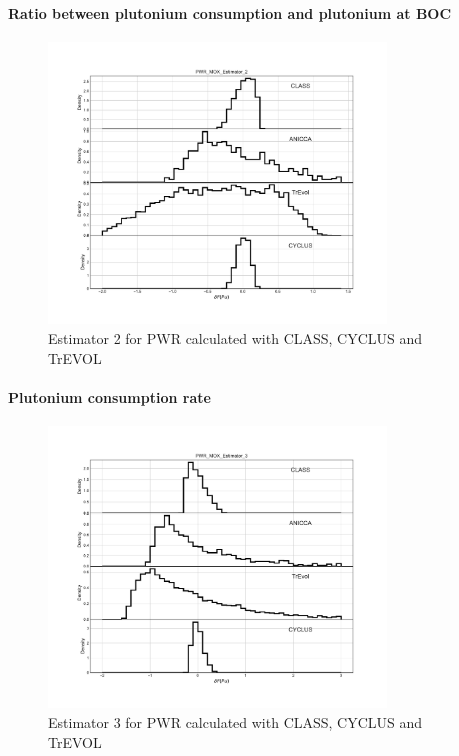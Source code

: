 \paragraph{Ratio between plutonium consumption and plutonium at BOC}
\begin{figure}[h]
	\begin{center}
		\includegraphics[width = 0.8\textwidth]{../../Feature_1/RAW_DATA/FIG/PWR_MOX_Estimator_2.pdf}
		\caption{Estimator 2 for PWR calculated with CLASS, CYCLUS and TrEVOL}
		\label{fig:Est2_PWR}
	\end{center}
\end{figure}


\paragraph{Plutonium consumption rate}
\begin{figure}[h]
	\begin{center}
		\includegraphics[width = 0.8\textwidth]{../../Feature_1/RAW_DATA/FIG/PWR_MOX_Estimator_3.pdf}
		\caption{Estimator 3 for PWR calculated with CLASS, CYCLUS and TrEVOL}
		\label{fig:Est3_PWR}
	\end{center}
\end{figure}

